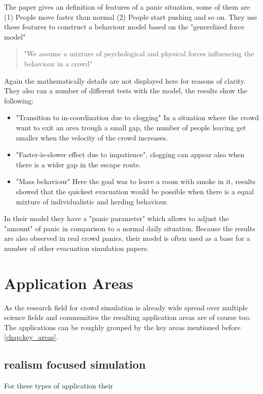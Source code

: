 \documentclass[sigconf]{acmart}
\begin{document}
The paper gives an definition of features of a panic situation, some of them are (1) People move faster than normal (2) People start pushing and so on. They use these features to construct a behaviour model based on the "generelized force model"\cite{hindsley_investigation_1986}
\begin{quote}
"We assume a mixture of psychological and physical forces influencing the behaviour in a crowd"
\end{quote}
Again the mathematically details are not displayed here for reasons of clarity. They also ran a number of different tests with the model, the results show the following:
\begin{itemize}
\item "Transition to in-coordination due to clogging" In a situation where the crowd want to exit an area trough a small gap, the number of people leaving get smaller when the velocity of the crowd increases.
\item "Faster-is-slower effect due to impatience", clogging can appear also when there is a wider gap in the escape route. 
\item "Mass behaviour" Here the goal was to leave a room with smoke in it, results showed that the quickest evacuation would be possible when there is a equal mixture of individualistic and herding behaviour. 
\end{itemize}
In their model they have a "panic parameter" which allows to adjust the "amount" of panic in comparison to a normal daily situation. Because the results are also observed in real crowd panics, their model is often used as a base for a number of other evacuation simulation papers. \cite{braun_simulating_2005} \cite{zheng_modeling_2009}

\section{Application Areas}

As the research field for crowd simulation is already wide spread over multiple science fields and communities the resulting application areas are of course too. The applications can be roughly grouped by the key areas mentioned before \ref{chap:key_areas}. 

\subsection{realism focused simulation }

For these types of application their 
\end{document}
